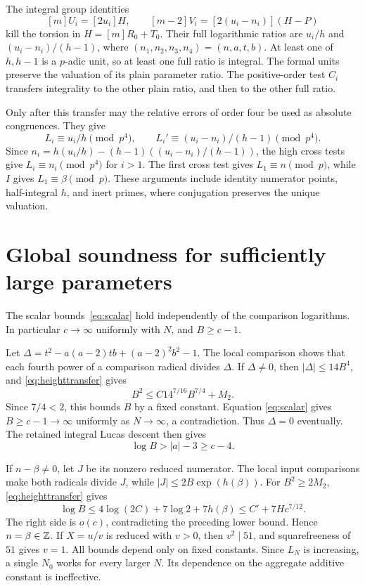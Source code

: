 \documentclass[11pt,a4paper]{article}
\begin{document}
The integral group identities
\[
                  [m]U_i=[2u_i]H,\qquad
                  [m-2]V_i=[2(u_i-n_i)](H-P)
\]
kill the torsion in $H=[m]R_0+T_0$. Their full logarithmic ratios
are $u_i/h$ and $(u_i-n_i)/(h-1)$, where
$(n_1,n_2,n_3,n_4)=(n,a,t,b)$. At least one of $h,h-1$ is a
$p$-adic unit, so at least one full ratio is integral. The formal
units preserve the valuation of its plain parameter ratio.
The positive-order test $C_i$ transfers integrality to the other
plain ratio, and then to the other full ratio.

Only after this transfer may the relative errors of order four
be used as absolute congruences. They give
\[
 L_i\equiv u_i/h\pmod{p^4},\qquad
 L_i'\equiv(u_i-n_i)/(h-1)\pmod{p^4}.
\]
Since $n_i=h(u_i/h)-(h-1)((u_i-n_i)/(h-1))$, the high cross tests
give $L_i\equiv n_i\pmod{p^4}$ for $i>1$. The first cross test
gives $L_1\equiv n\pmod p$, while $I$ gives $L_1\equiv\beta\pmod p$.
These arguments include identity numerator points, half-integral $h$,
and inert primes, where conjugation preserves the unique valuation.

\section{Global soundness for sufficiently large parameters}\label{sec:soundness}
The scalar bounds~\eqref{eq:scalar} hold independently of the
comparison logarithms. In particular $c\to\infty$ uniformly with $N$,
and $B\ge c-1$.

Let
$\Delta=t^2-a(a-2)tb+(a-2)^2b^2-1$.
The local comparison shows that each fourth power of a comparison
radical divides $\Delta$. If $\Delta\ne0$, then
$|\Delta|\le14B^4$, and \eqref{eq:heighttransfer} gives
\[
                  B^2\le C14^{7/16}B^{7/4}+M_2.
\]
Since $7/4<2$, this bounds $B$ by a fixed constant. Equation
\eqref{eq:scalar} gives $B\ge c-1\to\infty$ uniformly as
$N\to\infty$, a contradiction. Thus $\Delta=0$ eventually.
The retained integral Lucas descent then gives
\[
                         \log B>|a|-3\ge c-4.
\]

If $n-\beta\ne0$, let $J$ be its nonzero reduced numerator.
The local input comparisons make both radicals divide $J$,
while $|J|\le2B\exp(h(\beta))$. For $B^2\ge2M_2$,
\eqref{eq:heighttransfer} gives
\[
 \log B\le4\log(2C)+7\log2+7h(\beta)
 \le C'+7Hc^{7/12}.
\]
The right side is $o(c)$, contradicting the preceding lower bound.
Hence $n=\beta\in\mathbb Z$. If $X=u/v$ is reduced with $v>0$, then
$v^2\mid51$, and squarefreeness of $51$ gives $v=1$.
All bounds depend only on fixed constants. Since $L_N$ is increasing,
a single $N_0$ works for every larger $N$. Its dependence on the
aggregate additive constant is ineffective.
\end{document}
